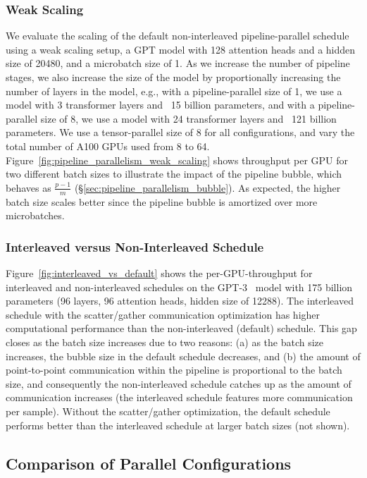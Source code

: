 \subsubsection{Weak Scaling}

We evaluate the scaling of the default non-interleaved pipeline-parallel schedule using a weak scaling setup, a GPT model with 128 attention heads and a hidden size of 20480, and a microbatch size of 1. As we increase the number of pipeline stages, we also increase the size of the model by proportionally increasing the number of layers in the model, e.g., with a pipeline-parallel size of 1, we use a model with 3 transformer layers and ~15 billion parameters, and with a pipeline-parallel size of 8, we use a model with 24 transformer layers and ~121 billion parameters. We use a tensor-parallel size of 8 for all configurations, and vary the total number of A100 GPUs used from 8 to 64. Figure~\ref{fig:pipeline_parallelism_weak_scaling} shows throughput per GPU for two different batch sizes to illustrate the impact of the pipeline bubble, which behaves as $\frac{p-1}{m}$ (\S\ref{sec:pipeline_parallelism_bubble}). As expected, the higher batch size scales better since the pipeline bubble is amortized over more microbatches.

\subsubsection{Interleaved versus Non-Interleaved Schedule}

Figure~\ref{fig:interleaved_vs_default} shows the per-GPU-throughput for interleaved and non-interleaved schedules on the GPT-3~\cite{gpt3} model with 175 billion parameters (96 layers, 96 attention heads, hidden size of 12288). The interleaved schedule with the scatter/gather communication optimization has higher computational performance than the non-interleaved (default) schedule. This gap closes as the batch size increases due to two reasons: (a) as the batch size increases, the bubble size in the default schedule decreases, and (b) the amount of point-to-point communication within the pipeline is proportional to the batch size, and consequently the non-interleaved schedule catches up as the amount of communication increases (the interleaved schedule features more communication per sample). Without the scatter/gather optimization, the default schedule performs better than the interleaved schedule at larger batch sizes (not shown).

\subsection{Comparison of Parallel Configurations}
\label{sec:evaluation_parallel_configurations}


